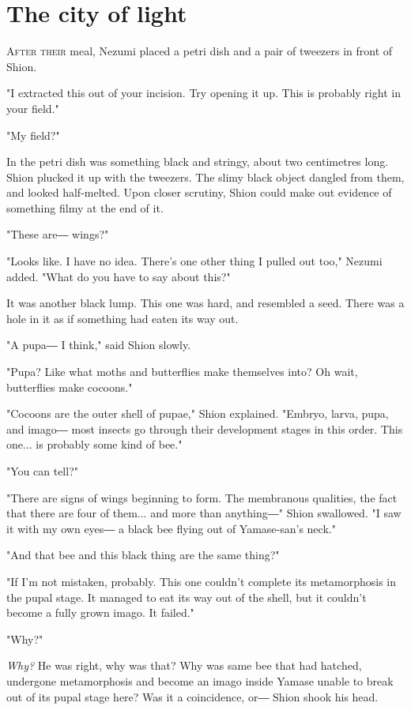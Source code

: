 
\chapter{The city of light}

\lettrine{A}{fter their} meal, Nezumi placed a petri dish and a pair of tweezers in
front of Shion.

"I extracted this out of your incision. Try opening it up. This is
probably right in your field."

"My field?"

In the petri dish was something black and stringy, about two centimetres
long. Shion plucked it up with the tweezers. The slimy black object
dangled from them, and looked half-melted. Upon closer scrutiny, Shion
could make out evidence of something filmy at the end of it.

"These are― wings?"

"Looks like. I have no idea. There's one other thing I pulled out too,"
Nezumi added. "What do you have to say about this?"

It was another black lump. This one was hard, and resembled a seed.
There was a hole in it as if something had eaten its way out.

"A pupa― I think," said Shion slowly.

"Pupa? Like what moths and butterflies make themselves into? Oh wait,
butterflies make cocoons."

"Cocoons are the outer shell of pupae," Shion explained. "Embryo, larva,
pupa, and imago― most insects go through their development stages in
this order. This one... is probably some kind of bee."

"You can tell?"

"There are signs of wings beginning to form. The membranous qualities,
the fact that there are four of them... and more than anything―" Shion
swallowed. "I saw it with my own eyes― a black bee flying out of
Yamase-san's neck."

"And that bee and this black thing are the same thing?"

"If I'm not mistaken, probably. This one couldn't complete its
metamorphosis in the pupal stage. It managed to eat its way out of the
shell, but it couldn't become a fully grown imago. It failed."

"Why?"

\emph{Why?} He was right, why was that? Why was same bee that had hatched,
undergone metamorphosis and become an imago inside Yamase unable to
break out of its pupal stage here? Was it a coincidence, or― Shion shook
his head.

